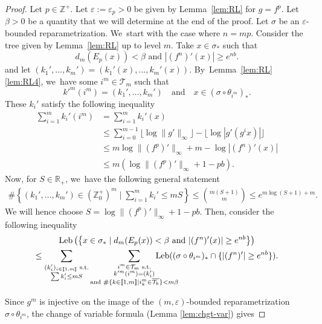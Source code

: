 \documentclass[JEP,XML,SOM,Unicode,NoFloatCountersInSection,published]{cedram}
\DeclareMathOperator{\Leb}{Leb}
\theoremstyle{definition}
\newcommand{\bbR}{{\mathbb{R}}}
\newcommand{\bbZ}{{\mathbb{Z}}}
\begin{document}
\begin{proof}
Let $p \in \bbZ^+$. Let $\varepsilon := \varepsilon_p > 0$ be given by Lemma~\ref{lem:RL} for $g = f^p$.
Let $\beta > 0$ be a quantity that we will determine at the end of the proof.
Let $\sigma$ be an $\varepsilon$-bounded reparametrization. We~start with the case where $n = mp$.
Consider the tree given by Lemma~\ref{lem:RL} up to level $m$.
Take $x \in \sigma_*$ such that
\[
d_m(E_p(x)) < \beta \text{ and } |(f^n)'(x)| \geq e^{nb}.
\]
and let $(k_1',\dots, k_m') = (k_1'(x),\dots, k_m'(x))$. By~Lemma~\ref{lem:RL}\eqref{lem:RL4}, we~have some $i^m \in \mathcal{T}_m$ such that
\[
k'^m(i^m) = (k_1',\dots, k_m') \quad \text{and} \quad x \in \left (\sigma \circ \theta_{i^m} \right)_*.
\]
These $k_i'$ satisfy the following inequality
\begin{align*}
\sum_{i=1}^m k_i'(i^m)
&= \sum_{i=1}^m k_i'(x)\\
&\leq \sum_{i=0}^{m-1} \lfloor \log \| g' \|_{\infty} \rfloor - \lfloor \log |g'(g^i x)| \rfloor\\
&\leq m \log \| (f^p)' \|_{\infty} + m - \log |(f^n)'(x)|\\
&\leq m \left (\log \| (f^p)'\|_{\infty} + 1 - pb \right).
\end{align*}
Now, for $S \in \bbR_+$, we~have the following general statement
\begin{align}
\# \left \{ (k_1',\dots, k_m') \in (\bbZ_0^+)^m \mid \textstyle\sum_{i = 1}^m k_i' \leq m S \right \} \leq {\binom{m(S+1)} m} \leq e^{m \log (S+1) + m}.
\tag{$*$}
\label{ineq:3-1}
\end{align}
We will hence choose $S = \log \| (f^p)'\|_{\infty} + 1 - pb$. Then, consider the following inequality
\begin{multline*}
\Leb\left (\left \{ x \in \sigma_* \mid d_m(E_p(x)) < \beta \text{ and } | (f^n)'(x) | \geq e^{nb}\right \} \right)\\
\leq \sum_{\substack{(k_i')_{i \in [\![ 1, m ]\!]} \text{ s.t.}\\
\sum k_i' \leq m S}} \sum_{\substack{i^m \in \mathcal{T}_m \text{ s.t.}\\
k'^m(i^m) = (k_i')\\
\text{and } \# \{ k \in [\![ 1, m ]\!] \mid i^m_k \in \overline{\mathcal{T}_k} \} < m \beta}}
\hspace{-10mm}\Leb ((\sigma \circ \theta_{i^m})_* \cap \{ |(f^n)'| \geq e^{nb} \}).
\end{multline*}
\noindent
\begin{minipage}{\textwidth}
Since $g^m$ is injective on the image of the $(m, \varepsilon)$-bounded reparametrization $\sigma \circ \theta_{i^m}$, the change of variable formula (Lemma \ref{lem:chgt-var}) gives

\end{minipage}
\end{proof}
\end{document}

